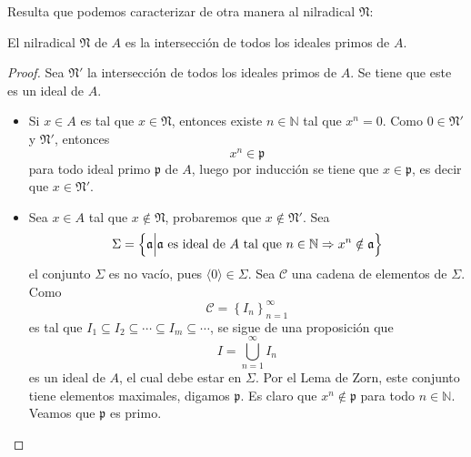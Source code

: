 \documentclass[12pt]{report}
\newcounter{it}
\theoremstyle{largebreak}
\begin{document}
    Resulta que podemos caracterizar de otra manera al nilradical $\mathfrak{N}$:

    \begin{propo}
        El nilradical $\mathfrak{N}$ de $A$ es la intersección de todos los ideales primos de $A$.
    \end{propo}

    \begin{proof}
        Sea $\mathfrak{N}'$ la intersección de todos los ideales primos de $A$. Se tiene que este es un ideal de $A$.
        \begin{itemize}
            \item Si $x\in A$ es tal que $x\in\mathfrak{N}$, entonces existe $n\in\mathbb{N}$ tal que $x^n=0$. Como $0\in\mathfrak{N}'$ y $\mathfrak{N}'$, entonces
            \begin{equation*}
                x^n\in\mathfrak{p}
            \end{equation*}
            para todo ideal primo $\mathfrak{p}$ de $A$, luego por inducción se tiene que $x\in\mathfrak{p}$, es decir que $x\in\mathfrak{N}'$.
            \item Sea $x\in A$ tal que $x\notin\mathfrak{N}$, probaremos que $x\notin\mathfrak{N}'$. Sea
            \begin{equation*}
                \Sigma=\left\{\mathfrak{a}\Big|\mathfrak{a}\textup{ es ideal de $A$ tal que }n\in\mathbb{N}\Rightarrow x^n\notin\mathfrak{a} \right\}
            \end{equation*}
            el conjunto $\Sigma$ es no vacío, pues $\langle 0\rangle\in\Sigma$. Sea $\mathcal{C}$ una cadena de elementos de $\Sigma$. Como
            \begin{equation*}
                \mathcal{C}=\left\{I_n \right\}_{ n=1}^\infty
            \end{equation*}
            es tal que $I_1\subseteq I_2\subseteq\cdots\subseteq I_m\subseteq\cdots$, se sigue de una proposición que
            \begin{equation*}
                I=\bigcup_{ n=1}^\infty I_n
            \end{equation*} 
            es un ideal de $A$, el cual debe estar en $\Sigma$. Por el Lema de Zorn, este conjunto tiene elementos maximales, digamos $\mathfrak{p}$. Es claro que $x^n\notin\mathfrak{p}$ para todo $n\in\mathbb{N}$. Veamos que $\mathfrak{p}$ es primo.


\end{itemize}
\end{proof}
\end{document}
